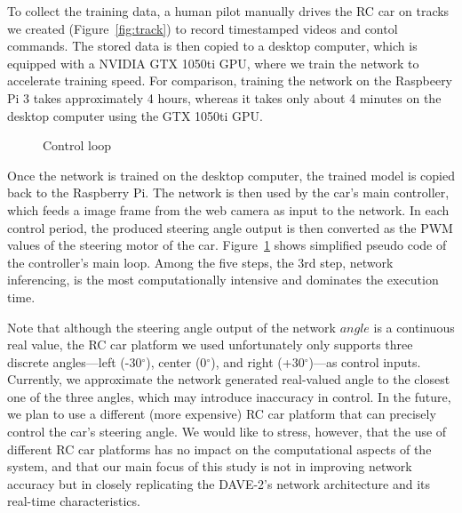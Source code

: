 To collect the training data, a human pilot manually drives the RC car
on tracks we created (Figure~\ref{fig:track}) to record
timestamped videos and contol commands. The stored data is then copied 
to a desktop computer, which is equipped with a NVIDIA GTX 1050ti GPU, 
where we train the network to accelerate training speed. 
For comparison, training the network on the Raspbeery Pi 3 takes
approximately 4 hours, whereas it takes only about 4 minutes on the
desktop computer using the GTX 1050ti GPU.

\begin{figure}[h]
  
  \caption{Control loop}
  \label{fig:controlloop}
\end{figure}

Once the network is trained on the desktop computer, the trained model
is copied back to the Raspberry Pi. The network is then used
by the car's main controller, which feeds a image frame from the web
camera as input to the network. In each control period, the produced 
steering angle output is then converted as the PWM values of the 
steering motor of the car. Figure~\ref{fig:controlloop} shows simplified 
pseudo code of the controller's main loop. Among the five steps, the 3rd step, 
network inferencing, is the most computationally intensive and dominates the
execution time.

Note that although the steering angle output of the network $angle$ is
a continuous real value, the RC car platform we used unfortunately
only supports three discrete angles---left (-30$^{\circ}$), center
(0$^{\circ}$), and right (+30$^{\circ}$)---as control inputs.
Currently, we approximate the network generated real-valued
angle to the closest one of the three angles, which may
introduce inaccuracy in control.
In the future, we plan to use a different (more expensive) RC car
platform that can precisely control the car's steering angle.
We would like to stress, however, that the use of different RC car
platforms has no impact on the computational 
aspects of the system, and that our main focus of this study is
not in improving network accuracy but in closely replicating the
DAVE-2's network architecture and its real-time characteristics.

